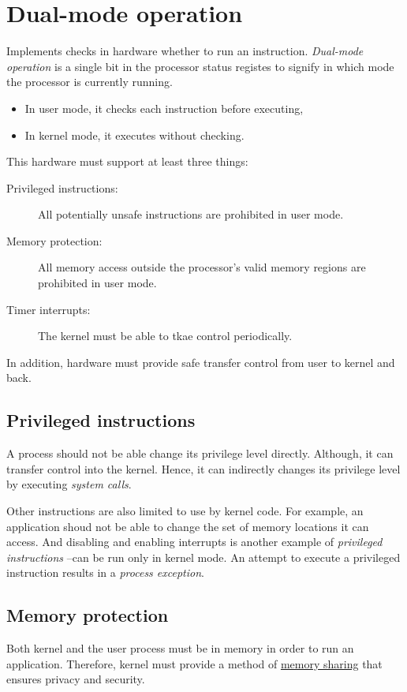 \section{Dual-mode operation}
Implements checks in hardware whether to run an instruction. \textit{Dual-mode operation} is a single bit in the processor status registes to signify in which mode the processor is currently running.
\begin{itemize}
    \item In user mode, it checks each instruction before executing,
    \item In kernel mode, it executes without checking.
\end{itemize}

This hardware must support at least three things:
\begin{description}
    \item[Privileged instructions:] All potentially unsafe instructions are prohibited in user mode.
    \item[Memory protection:] All memory access outside the processor's valid memory regions are prohibited in user mode.
    \item[Timer interrupts:] The kernel must be able to tkae control periodically.
\end{description}
In addition, hardware must provide safe transfer control from user to kernel and back.
\subsection{Privileged instructions}
A process should not be able change its privilege level directly. Although, it can transfer control into the kernel. Hence, it can indirectly changes its privilege level by executing \textit{system calls}.

Other instructions are also limited to use by kernel code. For example, an application shoud not be able to change the set of memory locations it can access. And disabling and enabling interrupts is another example of \textit{privileged instructions} --can be run only in kernel mode. An attempt to execute a privileged instruction results in a \textit{process exception}.

\subsection{Memory protection}
Both kernel and the user process must be in memory in order to run an application. Therefore, kernel must provide a method of \underline{memory sharing} that ensures privacy and security.

